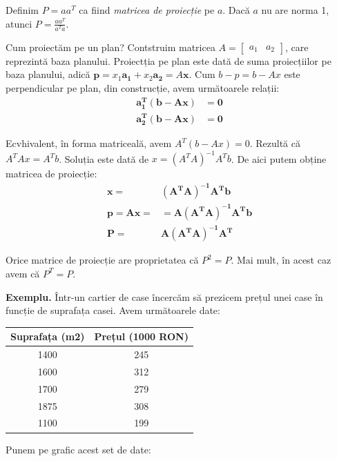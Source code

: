\documentclass{exam}
\begin{document}
Definim $P = a a^T$ ca fiind \textit{matricea de proiecție} pe $a$. Dacă $a$ nu
are norma 1, atunci $P = \frac{a a^T}{a^T a}$.

Cum proiectăm pe un plan? Contstruim matricea $A = \begin{bmatrix} a_1 & a_2 \end{bmatrix}$,
care reprezintă baza planului. Proiectția pe plan este dată de suma proiecțiilor
pe baza planului, adică $\mathbf{p} = x_1 \mathbf{a_1} + x_2 \mathbf{a_2} = A \mathbf{x}$.
Cum $b - p = b - Ax$ este perpendicular pe plan, din construcție, avem
următoarele relații:
\begin{align*}
	\mathbf{a_1^T (b - Ax)} & \mathbf{= 0} \\
	\mathbf{a_2^T (b - Ax)} & \mathbf{= 0}
\end{align*}

Ecvhivalent, în forma matriceală, avem $A^T (b - Ax) = 0$. Rezultă că
$A^T A x = A^T b$. Soluția este dată de $x = (A^T A)^{-1} A^T b$. De aici putem
obține matricea de proiecție:
\begin{align*}
	\mathbf{x = }      & \mathbf{(A^T A)^{-1} A^T b}     \\
	\mathbf{p = A x =} & = \mathbf{A (A^T A)^{-1} A^T b} \\
	\mathbf{P = }      & \mathbf{A (A^T A)^{-1} A^T}
\end{align*}

Orice matrice de proiecție are proprietatea că $P^2 = P$. Mai mult, în acest caz
avem că $P^T = P$.

\textbf{Exemplu.} Într-un cartier de case încercăm să prezicem prețul unei case
în funcție de suprafața casei. Avem următoarele date:

\begin{center}
	\begin{tabular}{|c|c|}
		\hline
		Suprafața (m2) & Prețul (1000 RON) \\
		\hline
		1400           & 245               \\
		1600           & 312               \\
		1700           & 279               \\
		1875           & 308               \\
		1100           & 199               \\
		\hline
	\end{tabular}
\end{center}

Punem pe grafic acest set de date:
\begin{center}
\end{center}
\end{document}
